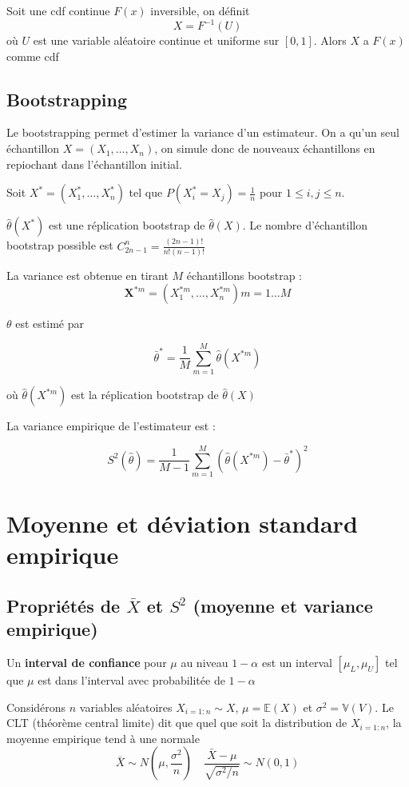 \documentclass[12pt,a4paper]{article}
\begin{document}
Soit une cdf continue $F(x)$ inversible, on définit
$$X = F^{-1}(U)$$
où $U$ est une variable aléatoire continue et uniforme sur $[0,1]$. Alors $X$ a $F(x)$ comme cdf

\subsection{Bootstrapping}

Le bootstrapping permet d'estimer la variance d'un estimateur. On a qu'un seul échantillon $X=(X_1,\dots,X_n)$, on simule donc de nouveaux échantillons en repiochant dans l'échantillon initial.

Soit $X^* = (X_1^*, \dots, X_n^*)$ tel que $P(X_i^* = X_j) = \frac{1}{n}$ pour $1 \leq i,j \leq n$.

$\hat{\theta}(X^*)$ est une réplication bootstrap de $\hat{\theta}(X)$. Le nombre d'échantillon bootstrap possible est $C_{2n-1}^n = \frac{(2n-1)!}{n!(n-1)!}$

La variance est obtenue en tirant $M$ échantillons bootstrap :
$$\mathbf{X}^{*m} = (X_1^{*m},\dots,X_n^{*m}) m = 1\dots M$$

\bigskip

$\theta$ est estimé par

$$\bar{\theta}^* = \frac{1}{M} \sum_{m=1}^{M} \hat{\theta}(X^{*m})$$

où $\hat{\theta}(X^{*m})$ est la réplication bootstrap de $\hat{\theta}(X)$

La variance empirique de l'estimateur est :

$$
S^2(\hat{\theta}) = \frac{1}{M-1} \sum_{m=1}^{M} \left(\hat{\theta}(X^{*m}) - \bar{\theta}^{*}\right)^2
$$


\break

\section{Moyenne et déviation standard empirique}

\subsection{Propriétés de $\bar{X}$ et $S^2$ (moyenne et variance empirique)}

Un \textbf{interval de confiance} pour $\mu$ au niveau $1 - \alpha$ est un interval $[\mu_L,\mu_U]$ tel que $\mu$ est dans l'interval avec probabilitée de $1 - \alpha$

\bigskip

Considérons $n$ variables aléatoires $X_{i=1:n} \sim X$, $\mu = \mathbb{E}(X)$ et $\sigma^2 = \mathbb{V}(V)$. Le CLT (théorème central limite) dit que quel que soit la distribution de $X_{i=1:n}$, la moyenne empirique tend à une normale
$$\bar{X} \sim N\left(\mu, \frac{\sigma^2}{n}\right) \quad \frac{\bar{X} - \mu}{\sqrt{\sigma^2/n}} \sim N(0,1)$$
\end{document}
